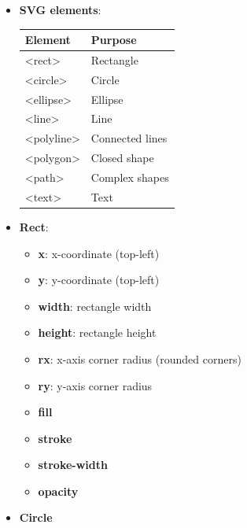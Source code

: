 \documentclass{report}
\begin{document}
\begin{itemize}
\begin{itemize}
                \item Best for interactive graphics
            \end{itemize}
        \item \textbf{SVG elements}: 
            \begin{center}
                \begin{tabularx}{\textwidth}{@{}XX@{}}
                    \toprule
                    \textbf{Element} &	\textbf{Purpose} \\
                    \midrule
                    <rect>	& Rectangle\\[2ex]
                    <circle>&	Circle\\[2ex]
                    <ellipse>	&Ellipse\\[2ex]
                    <line>	&Line\\[2ex]
                    <polyline>	&Connected lines\\[2ex]
                    <polygon>	&Closed shape\\[2ex]
                    <path>	&Complex shapes\\[2ex]
                    <text>	&Text\\[2ex]
                    \bottomrule
                \end{tabularx}
            \end{center}
        \item \textbf{Rect}:
            \begin{itemize}
                \item \textbf{x}:  x-coordinate (top-left)
                \item \textbf{y}:  y-coordinate (top-left)
                \item \textbf{width}:  rectangle width
                \item \textbf{height}:  rectangle height
                \item \textbf{rx}:  x-axis corner radius (rounded corners)
                \item \textbf{ry}:  y-axis corner radius
                \item \textbf{fill}
                \item \textbf{stroke}
                \item \textbf{stroke-width}
                \item \textbf{opacity}
            \end{itemize}
        \item \textbf{Circle}

\end{itemize}
\end{document}
